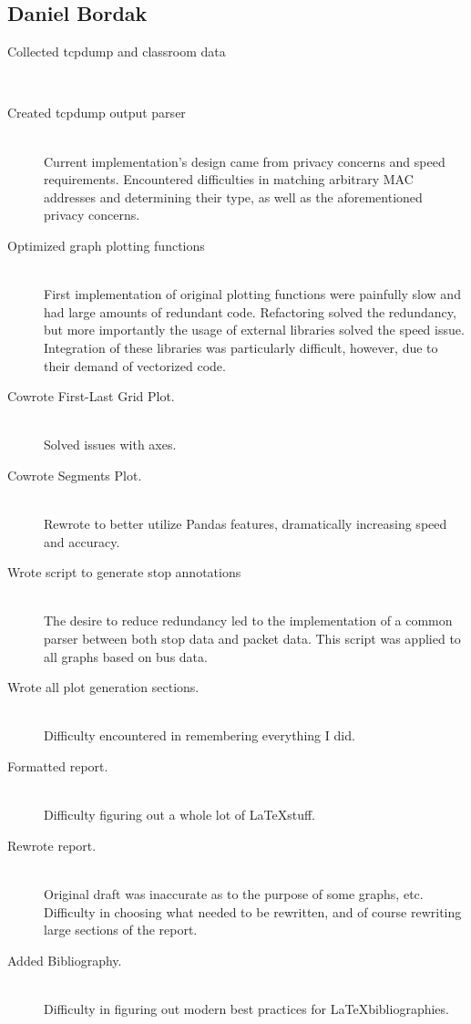 \documentclass[11pt,journal,compsoc]{IEEEtran} %
\newcommand{\ditem}[2]{\item[#1] \hfill \\ #2}
\begin{document}





\FloatBarrier

\printbibliography

\subsection*{Daniel Bordak}
\begin{description}
\ditem{Collected tcpdump and classroom data}{}
\ditem{Created tcpdump output parser}{
  Current implementation's design came from privacy concerns and speed requirements.
  Encountered difficulties in matching arbitrary MAC addresses and determining their type, as well as the aforementioned privacy concerns.
}
\ditem{Optimized graph plotting functions}{
  First implementation of original plotting functions were painfully slow and had large amounts of redundant code.
  Refactoring solved the redundancy, but more importantly the usage of external libraries solved the speed issue.
  Integration of these libraries was particularly difficult, however, due to their demand of vectorized code.
}
\ditem{Cowrote First-Last Grid Plot.}{
  Solved issues with axes.
}
\ditem{Cowrote Segments Plot.}{
  Rewrote to better utilize Pandas features, dramatically increasing speed and accuracy.
}
\ditem{Wrote script to generate stop annotations}{
  The desire to reduce redundancy led to the implementation of a common parser between both stop data and packet data.
  This script was applied to all graphs based on bus data.
}
\ditem{Wrote all plot generation sections.}{
  Difficulty encountered in remembering everything I did.%
}
\ditem{Formatted report.}{
  Difficulty figuring out a whole lot of \LaTeX stuff.
}
\ditem{Rewrote report.}{
  Original draft was inaccurate as to the purpose of some graphs, etc.
  Difficulty in choosing what needed to be rewritten, and of course rewriting large sections of the report.
}
\ditem{Added Bibliography.}{
  Difficulty in figuring out modern best practices for \LaTeX bibliographies.
}
\end{description}
\end{document}
